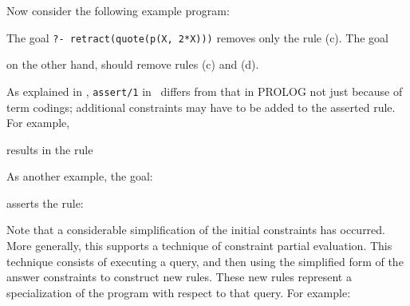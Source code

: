 
\noindent
Now consider the following example program:


\noindent
The goal {\tt ?- retract(quote(p(X, 2*X)))} removes only the rule (c).
The goal 


\noindent
on the other hand, should remove rules (c) and (d).

As explained in  \cite{HEINTZE89}, {\tt assert/1} in \CLPR\
differs from that in PROLOG not just because of term codings;
additional constraints may have to be added to the asserted rule.
For example,


\noindent
results in the rule


\noindent
As another example, the goal:


\noindent
asserts the rule:


\noindent
Note that a considerable simplification of the initial constraints has
occurred.  More generally, this supports a technique of constraint partial
evaluation.  This technique consists of
executing a query, and then using the simplified form of the answer
constraints to construct new rules.  These new rules represent a
specialization of the program with respect to that query.
For example:

